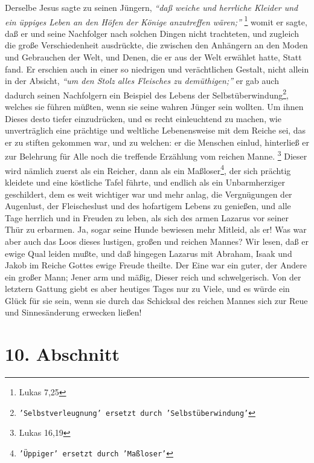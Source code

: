 Derselbe Jesus sagte
zu seinen Jüngern, 
\textit{"`daß weiche und herrliche Kleider und ein üppiges Leben an
den Höfen der Könige anzutreffen wären;"'}
\footnote{Lukas 7,25} 
womit er sagte,
daß er und seine Nachfolger nach solchen Dingen nicht trachteten, und zugleich
die große Verschiedenheit ausdrückte, die zwischen den Anhängern an den Moden
und Gebrauchen der Welt, und Denen, die er aus der Welt erwählet hatte, Statt
fand. Er erschien auch in einer so niedrigen und verächtlichen Gestalt, nicht
allein in der Absicht, 
\textit{"`um den Stolz alles Fleisches zu demüthigen;"'} er gab
auch dadurch seinen Nachfolgern ein Beispiel des Lebens der Selbstüberwindung\footnote{\texttt{'Selbstverleugnung' ersetzt durch 'Selbstüberwindung'}},
welches sie führen müßten, wenn sie seine wahren Jünger sein wollten. Um ihnen
Dieses desto tiefer einzudrücken, und es recht einleuchtend zu machen, wie
unverträglich eine prächtige und weltliche Lebenensweise mit dem Reiche sei, das
er zu stiften gekommen war, und zu welchen: er die Menschen einlud, hinterließ
er zur Belehrung für Alle noch die treffende Erzählung vom reichen
Manne.
\footnote{Lukas 16,19} 
Dieser wird nämlich zuerst als ein Reicher, dann als
ein Maßloser\footnote{\texttt{'Üppiger' ersetzt durch 'Maßloser'}}, der sich prächtig kleidete und eine köstliche Tafel führte, und
endlich als ein Unbarmherziger geschildert, dem es weit wichtiger war und mehr
anlag, die Vergnügungen der Augenlust, der Fleischeslust und des hofartigem
Lebens zu genießen, und alle Tage herrlich und in Freuden zu leben, als sich des
armen Lazarus vor seiner Thür zu erbarmen. Ja, sogar seine Hunde bewiesen mehr
Mitleid, als er! Was war aber auch das Loos dieses lustigen, großen und reichen
Mannes? Wir lesen, daß er ewige Qual leiden mußte, und daß hingegen Lazarus mit
Abraham, Isaak und Jakob im Reiche Gottes ewige Freude theilte. Der Eine war ein
guter, der Andere ein großer Mann; Jener arm und mäßig, Dieser reich und
schwelgerisch. Von der letztern Gattung giebt es aber heutiges Tages nur zu
Viele, und es würde ein Glück für sie sein, wenn sie durch das Schicksal des
reichen Mannes sich zur Reue und Sinnesänderung erwecken ließen!

\section{10. Abschnitt} \label{kap14_ab10}

